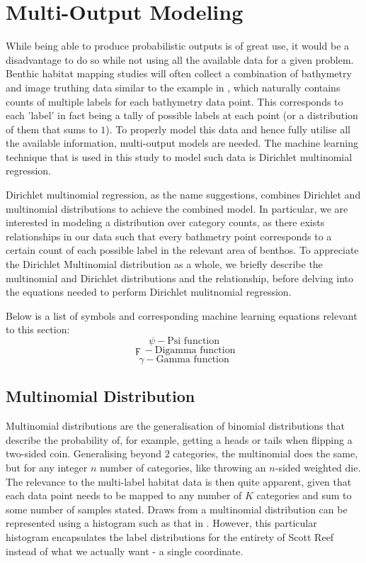 \chapter{Multi-Output Modeling} \label{chap:dms}
While being able to produce probabilistic outputs is of great use, it would be a disadvantage to do so while not using all the available data for a given problem. Benthic habitat mapping studies will often collect a combination of bathymetry and image truthing data similar to the example in , which naturally contains counts of multiple labels for each bathymetry data point. This corresponds to each 'label' in fact being a tally of possible labels at each point (or a distribution of them that sums to $1$). To properly model this data and hence fully utilise all the available information, multi-output models are needed. The machine learning technique that is used in this study to model such data is Dirichlet multinomial regression.

Dirichlet multinomial regression, as the name suggestions, combines Dirichlet and multinomial distributions to achieve the combined model. In particular, we are interested in modeling a distribution over category counts, as there exists relationships in our data such that every bathmetry point corresponds to a certain count of each possible label in the relevant area of benthos. To appreciate the Dirichlet Multinomial distribution as a whole, we briefly describe the multinomial and Dirichlet distributions and the relationship, before delving into the equations needed to perform Dirichlet mulitnomial regression.

Below is a list of symbols and corresponding machine learning equations relevant to this section:
$$\psi - \text{Psi function}$$
$$\digamma - \text{Digamma function}$$
$$\gamma - \text{Gamma function}$$


\section{Multinomial Distribution}
Multinomial distributions are the generalisation of binomial distributions that describe the probability of, for example, getting a heads or tails when flipping a two-sided coin. Generalising beyond $2$ categories, the multinomial does the same, but for any integer $n$ number of categories, like throwing an $n$-sided weighted die. The relevance to the multi-label habitat data is then quite apparent, given that each data point needs to be mapped to any number of $K$ categories and sum to some number of samples stated. Draws from a multinomial distribution can be represented using a histogram such as that in . However, this particular histogram encapsulates the label distributions for the entirety of Scott Reef instead of what we actually want - a single coordinate.

